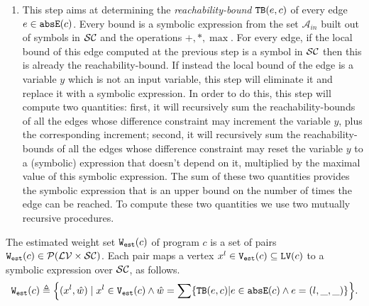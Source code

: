 {\begin{enumerate}
\item This step aims at determining the \emph{reachability-bound} ${\mathtt{TB}}(e, c)$ of every edge $e \in \mathtt{abs}{\mathtt{E}}(c)$. Every bound is a symbolic expression from the set $\mathcal{A}_{in}$ built out of symbols in $\mathcal{SC}$ and the operations $+, *, \max$. For every edge, if the local bound of this edge computed at the previous step is a symbol in $\mathcal{SC}$ then this is already the reachability-bound. If instead the local bound of the edge is a variable $y$ which is not an input variable, this step will eliminate it and replace it with a symbolic expression. In order to do this, this step will compute two quantities: first, it will recursively sum the reachability-bounds of all the edges whose difference constraint may increment the variable $y$, plus the corresponding increment; second, it will recursively sum the reachability-bounds of all the edges whose difference constraint may reset the variable $y$ to a (symbolic) expression that doesn't depend on it, multiplied by the maximal value of this symbolic expression. The sum of these two quantities provides the symbolic expression that is an upper bound on the number of times the edge can be reached. To compute these two quantities we use two mutually recursive procedures.
\end{enumerate}
}


   
\begin{defn}
 \label{def:adaptfun-weight}
The estimated weight set $\mathtt{{W_{est}}}(c)$ of program $c$ is a set of pairs $\mathtt{{W_{est}}}(c) \in \mathcal{P}(\mathcal{LV} \times \mathcal{SC})$.
Each pair maps
a vertex $x^l \in\mathtt{{V_{est}}}(c)\subseteq  \mathtt{LV}(c)$ to a symbolic expression over $\mathcal{SC}$,
as follows.
 \[
 \progW(c) \triangleq
 \left\{ (x^l, \hat{w}) 
\mid
x^l \in \progV(c) 
\land 
\hat{w} = 
\sum\left\{ \absclr(e, c) \middle\vert e \in \absE(c) \land e = (l, \_, \_) \right\}
\right\}.
\]
\end{defn}
%

